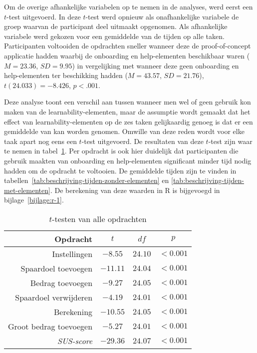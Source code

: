 Om de overige afhankelijke variabelen op te nemen in de analyses, werd eerst een $t$-test uitgevoerd. In deze $t$-test werd opnieuw als onafhankelijke variabele de groep waarvan de participant deel uitmaakt opgenomen. Als afhankelijke variabele werd gekozen voor een gemiddelde van de tijden op alle taken. Participanten voltooiden de opdrachten sneller wanneer deze de proof-of-concept applicatie hadden waarbij de onboarding en help-elementen beschikbaar waren ($M = 23.36$, $SD = 9.95$) in vergelijking met wanneer deze geen onboarding en help-elementen ter beschikking hadden ($M = 43.57$, $SD = 21.76$), $t(24.033) = -8.426$, $p < .001$.

Deze analyse toont een verschil aan tussen wanneer men wel of geen gebruik kon maken van de learnability-elementen, maar de assumptie wordt gemaakt dat het effect van learnability-elementen op de zes taken gelijkaardig genoeg is dat er een gemiddelde van kan worden genomen. Omwille van deze reden wordt voor elke taak apart nog eens een $t$-test uitgevoerd. De resultaten van deze $t$-test zijn waar te nemen in tabel~\ref{tab:ttest-opdrachten}. Per opdracht is ook hier duidelijk dat participanten die gebruik maakten van onboarding en help-elementen significant minder tijd nodig hadden om de opdracht te voltooien. De gemiddelde tijden zijn te vinden in tabellen~\ref{tab:beschrijving-tijden-zonder-elementen} en \ref{tab:beschrijving-tijden-met-elementen}. De berekening van deze waarden in R is bijgevoegd in bijlage~\ref{bijlage:r-1}.

\begin{table}[]
	\centering
	\begin{tabular}{r|ccc}
		\textbf{Opdracht} & \textbf{$t$} & \textbf{$df$} & \textbf{$p$} \\ \hline
		Instellingen & $-8.55$ & $24.10$ & $< 0.001$ \\
		Spaardoel toevoegen & $-11.11$ & $24.04$ & $< 0.001$ \\
		Bedrag toevoegen & $-9.27$ & $24.05$ & $< 0.001$ \\
		Spaardoel verwijderen & $-4.19$ & $24.01$ & $< 0.001$ \\
		Berekening & $-10.55$ & $24.05$ & $< 0.001$ \\
		Groot bedrag toevoegen & $-5.27$ & $24.01$ & $< 0.001$ \\
		\textit{SUS-score} & $-29.36$ & $24.07$ & $< 0.001$
	\end{tabular}
	\caption{$t$-testen van alle opdrachten}
	\label{tab:ttest-opdrachten}
\end{table}

